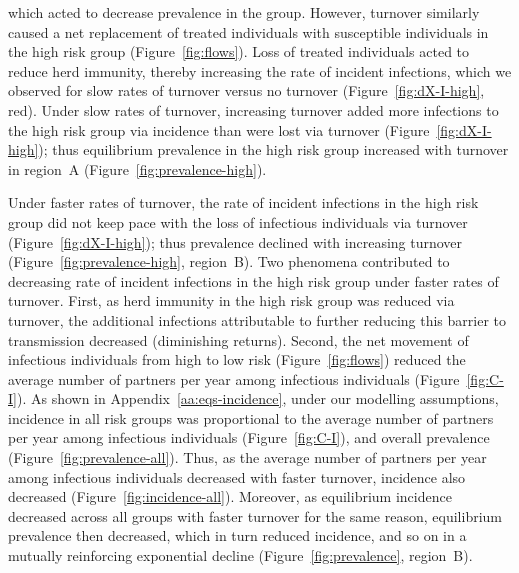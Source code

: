 which acted to decrease prevalence in the group.
However, turnover similarly caused a net replacement of
treated individuals with susceptible individuals in the high risk group
(Figure~\ref{fig:flows}).
Loss of treated individuals acted to reduce herd immunity,
thereby increasing the rate of incident infections,
which we observed for slow rates of turnover versus no turnover
(Figure~\ref{fig:dX-I-high}, red).
Under slow rates of turnover, increasing turnover
added more infections to the high risk group via incidence
than were lost via turnover
(Figure~\ref{fig:dX-I-high});
thus equilibrium prevalence in the high risk group
increased with turnover in region~A
(Figure~\ref{fig:prevalence-high}).
\par
Under faster rates of turnover,
the rate of incident infections in the high risk group did not keep pace with
the loss of infectious individuals via turnover
(Figure~\ref{fig:dX-I-high});
thus prevalence declined with increasing turnover
(Figure~\ref{fig:prevalence-high}, region~B).
Two phenomena contributed to decreasing rate of incident infections
in the high risk group under faster rates of turnover.
First, as herd immunity in the high risk group was reduced via turnover,
the additional infections attributable to
further reducing this barrier to transmission decreased
(diminishing returns).
Second, the net movement of infectious individuals
from high to low risk (Figure~\ref{fig:flows}) reduced
the average number of partners per year among infectious individuals
(Figure~\ref{fig:C-I}).
As shown in Appendix~\ref{aa:eqs-incidence},
under our modelling assumptions,
incidence in all risk groups was proportional to
the average number of partners per year among infectious individuals
(Figure~\ref{fig:C-I}),
and overall prevalence
(Figure~\ref{fig:prevalence-all}).
Thus, as the average number of partners per year among infectious individuals
decreased with faster turnover, incidence also decreased
(Figure~\ref{fig:incidence-all}).
Moreover, as equilibrium incidence decreased across all groups
with faster turnover for the same reason,
equilibrium prevalence then decreased, which in turn reduced incidence,
and so on in a mutually reinforcing exponential decline
(Figure~\ref{fig:prevalence}, region~B).
